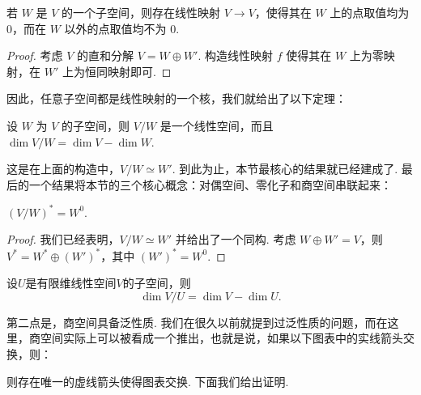 \begin{lemma}{}{}
    若 $W$ 是 $V$ 的一个子空间，则存在线性映射 $V \to V$，使得其在 $W$ 上的点取值均为 $0$，而在 $W$ 以外的点取值均不为 $0$.
\end{lemma}

\begin{proof}
    考虑 $V$ 的直和分解 $V = W \oplus W'$. 构造线性映射 $f$ 使得其在 $W$ 上为零映射，在 $W'$ 上为恒同映射即可.
\end{proof}

因此，任意子空间都是线性映射的一个核，我们就给出了以下定理：

\begin{theorem}{}{}
    设 $W$ 为 $V$ 的子空间，则 $V/W$ 是一个线性空间，而且 $\dim V/W = \dim V - \dim W$.
\end{theorem}

这是在上面的构造中，$V/W \simeq W'$. 到此为止，本节最核心的结果就已经建成了. 最后的一个结果将本节的三个核心概念：对偶空间、零化子和商空间串联起来：

\begin{theorem}{}{}
    $(V/W)^* = W^0$.
\end{theorem}

\begin{proof}
    我们已经表明，$V/W \simeq W'$ 并给出了一个同构. 考虑 $W \oplus W' = V$，则 $V^* = W^* \oplus (W')^*$，其中 $(W')^* = W^0$.
\end{proof}

\begin{corollary}{}{}
    设$U$是有限维线性空间$V$的子空间，则
    \[\dim V/U=\dim V-\dim U.\]
\end{corollary}

第二点是，商空间具备泛性质. 我们在很久以前就提到过泛性质的问题，而在这里，商空间实际上可以被看成一个推出，也就是说，如果以下图表中的实线箭头交换，则：

\begin{center}
\end{center}

则存在唯一的虚线箭头使得图表交换. 下面我们给出证明.

